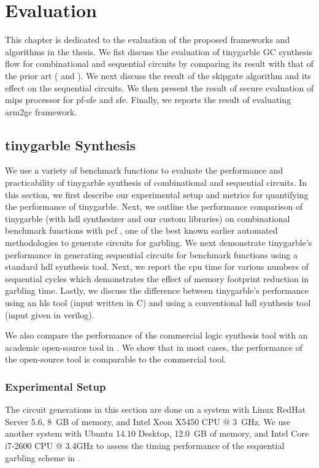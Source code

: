 \chapter{Evaluation}\label{chap:eval}
This chapter is dedicated to the evaluation of the proposed frameworks and algorithms in the thesis.
We fist discuss the evaluation of \gls{tinygarble} GC synthesis flow for combinational and sequential circuits by comparing its result with that of the prior art ( and ).
We next discuss the result of the \gls{skipgate} algorithm and its effect on the sequential circuits.
We then present the result of secure evaluation of \gls{mips} processor for \acrshort{pf-sfe} and \acrshort{sfe}.
Finally, we reports the result of evaluating \gls{arm2gc} framework.

\section{\gls{tinygarble} Synthesis}\label{sec:eval-tinygarble}
We use a variety of benchmark functions to evaluate the performance and practicability of \gls{tinygarble} synthesis of combinational and sequential circuits.
In this section, we first describe our experimental setup and metrics for quantifying the performance of \gls{tinygarble}.
Next, we outline the performance comparison of \gls{tinygarble} (with \acrshort{hdl} synthesizer and our custom libraries) on combinational benchmark functions with \gls{pcf} \cite{kreuter2013pcf}, one of the best known earlier automated methodologies to generate circuits for garbling.
We next demonstrate \gls{tinygarble}'s performance in generating sequential circuits for benchmark functions using a standard \acrshort{hdl} synthesis tool.
Next, we report the \acrshort{cpu} time for various numbers of sequential cycles which demonstrates the effect of memory footprint reduction in garbling time.
Lastly, we discuss the difference between \gls{tinygarble}'s performance using an \acrshort{hls} tool (input written in C) and using a conventional \acrshort{hdl} synthesis tool (input given in \gls{verilog}).

We also compare the performance of the commercial logic synthesis tool with an academic open-source tool in .
We show that in most cases, the performance of the open-source tool is comparable to the commercial tool.

\subsection{Experimental Setup}\label{ssec:eval-tinygarble-setup}
The circuit generations in this section are done on a system with Linux RedHat Server 5.6, 8~GB of memory, and Intel Xeon X5450 CPU @ 3~GHz.
We use another system with Ubuntu 14.10 Desktop, 12.0~GB of memory, and Intel Core i7-2600 CPU @ 3.4GHz to assess the timing performance of the sequential garbling scheme in .

